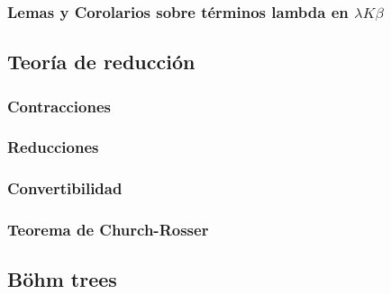 \subsubsection{Lemas y Corolarios sobre términos lambda en \(\lambda K \beta\)}

\subsection{Teoría de reducción}

\subsubsection{Contracciones}

\subsubsection{Reducciones}

\subsubsection{Convertibilidad}

\subsubsection{Teorema de Church-Rosser}

\subsection{Böhm trees}

